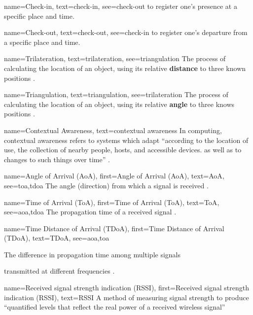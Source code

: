 \newcommand{\abbr}[1]{(#1)}

{
  name={Check-in},
  text={check-in},
  see={check-out}
}
{
  to register one's presence at a specific place and time.
}

{
  name={Check-out},
  text={check-out},
  see={check-in}
}
{
  to register one's departure from a specific place and
  time.
}

{
  name={Trilateration},
  text={trilateration},
  see={triangulation}
}
{
  The process of calculating the location of an object,
  using its relative \textbf{distance} to three known
  positions \parencite{triTri}.
}

{
  name={Triangulation},
  text={triangulation},
  see={trilateration}
}
{
  The process of calculating the location of an object,
  using its relative \textbf{angle} to three knows
  positions \parencite{triTri}.
}

{
  name={Contextual Awareness},
  text={contextual awareness}
}
{
  In computing, contextual awareness refers to systems
  which adapt \enquote{according to the location of use,
    the collection of nearby people, hosts, and accessible
    devices. as well as to changes to such things over
    time}
  \parencite{contextAware}.
}

{
  name={Angle of Arrival \abbr{AoA}},
  first={Angle of Arrival \abbr{AoA}},
  text={AoA},
  see={toa,tdoa}
}
{
  The angle (direction) from which a signal is received
  \parencite{suveryOfCellPos}.
}

{
  name={Time of Arrival \abbr{ToA}},
  first={Time of Arrival \abbr{ToA}},
  text={ToA},
  see={aoa,tdoa}
}
{
  The propagation time of a received signal
  \parencite{suveryOfCellPos}.
}

{
  name={Time Distance of Arrival \abbr{TDoA}},
  first={Time Distance of Arrival \abbr{TDoA}},
  text={TDoA},
  see={aoa,toa}
}
{
  The difference in propagation time among multiple signals

  transmitted at different frequencies
  \parencite{suveryOfCellPos}.
}

{
  name={Received signal strength indication \abbr{RSSI}},
  first={Received signal strength indication \abbr{RSSI}},
  text={RSSI}
}
{
  A method of measuring signal strength to produce
  \enquote{quantified levels that reflect the real power of
    a received wireless signal} \parencite{suveryOfCellPos}
}

